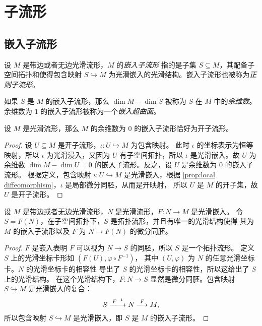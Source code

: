 \documentclass[fontset=none]{Notes}
\begin{document}
\chapter{子流形}

\section{嵌入子流形}

设 $M$ 是带边或者无边光滑流形，$M$ 的\emph{嵌入子流形}
指的是子集 $S\subseteq M$，其配备子空间拓扑和使得包含映射 $S\hookrightarrow M$
为光滑嵌入的光滑结构。嵌入子流形也被称为\emph{正则子流形}。

如果 $S$ 是 $M$ 的嵌入子流形，那么 $\dim M-\dim S$ 被称为 $S$ 在 $M$
中的\emph{余维数}。余维数为 $1$ 的嵌入子流形被称为一个\emph{嵌入超曲面}。

\begin{proposition}[开子流形]\label{prop:open submanifold}
  设 $M$ 是光滑流形，那么 $M$ 的余维数为 $0$ 的嵌入子流形恰好为开子流形。
\end{proposition}
\begin{proof}
  设 $U\subseteq M$ 是开子流形，$\iota:U\hookrightarrow M$ 为包含映射。
  此时 $\iota$ 的坐标表示为恒等映射，所以 $\iota$ 为光滑浸入，又因为
  $U$ 有子空间拓扑，所以 $\iota$ 是光滑嵌入。故 $U$ 为余维数
  $\dim M-\dim U=0$ 的嵌入子流形。反之，设 $U$ 是余维数为 $0$ 的嵌入子流形。
  根据定义，包含映射 $\iota:U\hookrightarrow M$ 是光滑嵌入，根据
  \autoref{prop:local diffeomorphism}，$\iota$ 是局部微分同胚，从而是开映射，
  所以 $U$ 是 $M$ 的开子集，故 $U$ 是开子流形。
\end{proof}

\begin{proposition}[嵌入的像作为子流形]\label{prop:image of embedding}
  设 $M$ 是带边或者无边光滑流形，$N$ 是光滑流形，$F:N\to M$ 是光滑嵌入。
  令 $S=F(N)$，在子空间拓扑下，$S$ 是拓扑流形，并且有唯一的光滑结构使得
  其为 $M$ 的嵌入子流形以及 $F$ 为 $N\to F(N)$ 的微分同胚。 
\end{proposition}
\begin{proof}
  $F$ 是嵌入表明 $F$ 可以视为 $N\to S$ 的同胚，所以 $S$ 是一个拓扑流形。
  定义 $S$ 上的光滑坐标卡形如 $\left(F(U),\varphi\circ F^{-1}\right)$，
  其中 $(U,\varphi)$ 为 $N$ 的任意光滑坐标卡。$N$ 的光滑坐标卡的相容性
  导出了 $S$ 的光滑坐标卡的相容性，所以这给出了 $S$ 上的光滑结构。
  在这个光滑结构下，$F:N\to S$ 显然是微分同胚。包含映射 $S\hookrightarrow M$
  是光滑嵌入的复合：
  \[
    S\xlongrightarrow{F^{-1}}N\xlongrightarrow{F}M,  
  \]
  所以包含映射 $S\hookrightarrow M$ 是光滑嵌入，即 $S$ 是 $M$ 的嵌入子流形。
\end{proof}
\end{document}
